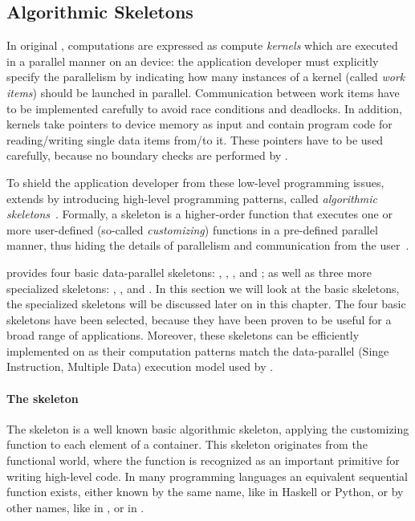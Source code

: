 \subsection{Algorithmic Skeletons}
\label{section:skelcl-programming-model:skeletons}
In original \OpenCL, computations are expressed as compute \emph{kernels} which are executed in a parallel manner on an \OpenCL device:
the application developer must explicitly specify the parallelism by indicating how many instances of a kernel (called \emph{work items}) should be launched in parallel.
Communication between work items have to be implemented carefully to avoid race conditions and deadlocks.
In addition, kernels take pointers to device memory as input and contain program code for reading/writing single data items from/to it.
These pointers have to be used carefully, because no boundary checks are performed by \OpenCL.

To shield the application developer from these low-level programming issues, \SkelCL extends \OpenCL by introducing high-level programming patterns, called \emph{algorithmic skeletons}~\cite{Cole1991}.
Formally, a skeleton is a higher-order function that executes one or more user-defined (so-called \emph{customizing}) functions in a pre-defined parallel manner, thus hiding the details of parallelism and communication from the user~\cite{GorlatchCo2011}.

\SkelCL provides four basic data-parallel skeletons: \map, \zip, \reduce, and \scan;
as well as three more specialized skeletons: \mapOverlap, \stencil, and \allpairs.
In this section we will look at the basic skeletons, the specialized skeletons will be discussed later on in this chapter.
The four basic skeletons have been selected, because they have been proven to be useful for a broad range of applications.
Moreover, these skeletons can be efficiently implemented on \GPUs as their computation patterns match the data-parallel \SIMD (Singe Instruction, Multiple Data) execution model used by \GPUs.



\paragraph{The \map skeleton}
The \map skeleton is a well known basic algorithmic skeleton, applying the customizing function to each element of a container.
This skeleton originates from the functional world, where the  function is recognized as an important primitive for writing high-level code.
In many programming languages an equivalent sequential function exists, either known by the same name, like in Haskell or Python, or by other names, like  in \Cpp, or  in \Csharp.

